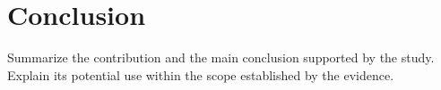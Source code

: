 \section{Conclusion}

Summarize the contribution and the main conclusion supported by the study.
Explain its potential use within the scope established by the evidence.
